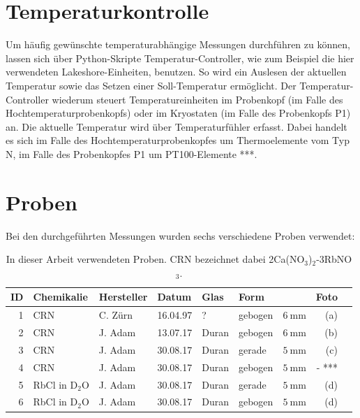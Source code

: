 \section{Temperaturkontrolle} \label{section:exp:temperaturkontrolle}

Um häufig gewünschte temperaturabhängige Messungen durchführen zu können, lassen sich über Python-Skripte Temperatur-Controller, wie zum Beispiel die hier verwendeten Lakeshore-Einheiten, benutzen. So wird ein Auslesen der aktuellen Temperatur sowie das Setzen einer Soll-Temperatur ermöglicht. Der Temperatur-Controller wiederum steuert Temperatureinheiten im Probenkopf (im Falle des Hochtemperaturprobenkopfs) oder im Kryostaten (im Falle des Probenkopfs P1) an. Die aktuelle Temperatur wird über Temperaturfühler erfasst. Dabei handelt es sich im Falle des Hochtemperaturprobenkopfes um Thermoelemente vom Typ N, im Falle des Probenkopfes P1 um PT100-Elemente ***.





\section{Proben} \label{section:exp:proben}

Bei den durchgeführten Messungen wurden sechs verschiedene Proben verwendet:

\begin{table}[H]
	\centering
	\begin{tabular}{rllllllrl}
		\hline
		ID & Chemikalie & Hersteller & Datum & Glas & Form & \diameter & Foto \\ 
		\hline
		1	& CRN &	C. Zürn &	16.04.97 &	? &	gebogen & 	$\SI{6}{\milli\meter}$ &	(a) \\
2	& CRN &	J. Adam &	13.07.17 &	Duran &	gebogen & 	$\SI{6}{\milli\meter}$ &	(b) \\
3	& CRN &	J. Adam &	30.08.17 &	Duran &	gerade & 	$\SI{5}{\milli\meter}$ &	(c) \\
4	& CRN &	J. Adam &	30.08.17 &	Duran &	gebogen & 	$\SI{5}{\milli\meter}$ &	- *** \\
5	& RbCl in D$_\text{2}$O &	J. Adam &	30.08.17 &	Duran &	gerade & 	$\SI{5}{\milli\meter}$ &	(d) \\
6	& RbCl in D$_\text{2}$O &	J. Adam &	30.08.17 &	Duran &	gebogen & 	$\SI{5}{\milli\meter}$ &	(d) \\ \hline
	\end{tabular} 
	\caption{In dieser Arbeit verwendeten Proben. CRN bezeichnet dabei 2Ca(NO$_\text{3}$)$_\text{2}$-3RbNO$_\text{3}$. \label{tab:exp:proben}}
\end{table}

